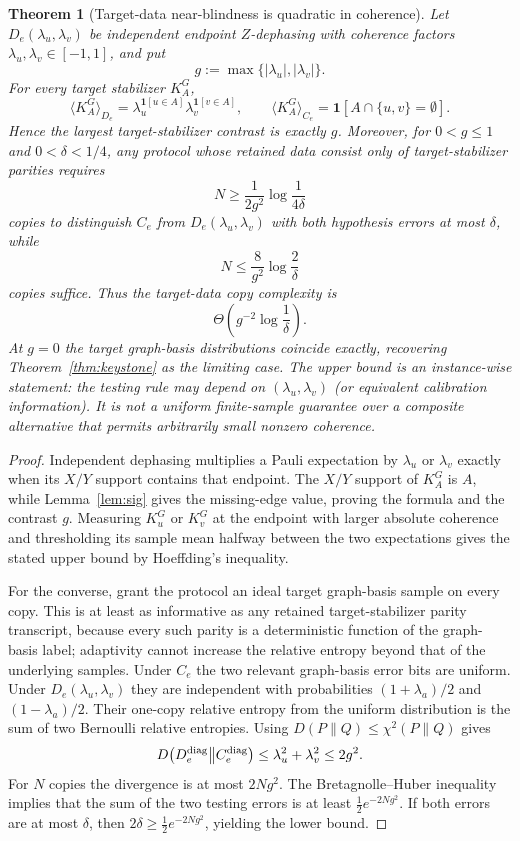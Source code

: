\documentclass[11pt]{article}
\newtheorem{theorem}{Theorem}[section]
\theoremstyle{remark}
\begin{document}
\begin{theorem}[Target-data near-blindness is quadratic in coherence]\label{prop:nearblind}
Let $D_e(\lambda_u,\lambda_v)$ be independent endpoint $Z$-dephasing with coherence factors $\lambda_u,\lambda_v\in[-1,1]$, and put
\[
 g:=\max\{|\lambda_u|,|\lambda_v|\}.
\]
For every target stabilizer $K_A^G$,
\[
\langle K_A^G\rangle_{D_e}
=\lambda_u^{\mathbf 1[u\in A]}\lambda_v^{\mathbf 1[v\in A]},
\qquad
\langle K_A^G\rangle_{C_e}=\mathbf 1[A\cap\{u,v\}=\emptyset].
\]
Hence the largest target-stabilizer contrast is exactly $g$. Moreover, for $0<g\le1$ and $0<\delta<1/4$, any protocol whose retained data consist only of target-stabilizer parities requires
\[
 N\ge \frac{1}{2g^2}\log\frac{1}{4\delta}
\]
copies to distinguish $C_e$ from $D_e(\lambda_u,\lambda_v)$ with both hypothesis errors at most $\delta$, while
\[
 N\le \frac{8}{g^2}\log\frac{2}{\delta}
\]
copies suffice. Thus the target-data copy complexity is
\[
\Theta\!\left(g^{-2}\log\frac1\delta\right).
\]
At $g=0$ the target graph-basis distributions coincide exactly, recovering Theorem~\ref{thm:keystone} as the limiting case. The upper bound is an instance-wise statement: the testing rule may depend on $(\lambda_u,\lambda_v)$ (or equivalent calibration information). It is not a uniform finite-sample guarantee over a composite alternative that permits arbitrarily small nonzero coherence.
\end{theorem}
\begin{proof}
Independent dephasing multiplies a Pauli expectation by $\lambda_u$ or $\lambda_v$ exactly when its $X/Y$ support contains that endpoint. The $X/Y$ support of $K_A^G$ is $A$, while Lemma~\ref{lem:sig} gives the missing-edge value, proving the formula and the contrast $g$. Measuring $K_u^G$ or $K_v^G$ at the endpoint with larger absolute coherence and thresholding its sample mean halfway between the two expectations gives the stated upper bound by Hoeffding's inequality.

For the converse, grant the protocol an ideal target graph-basis sample on every copy. This is at least as informative as any retained target-stabilizer parity transcript, because every such parity is a deterministic function of the graph-basis label; adaptivity cannot increase the relative entropy beyond that of the underlying samples. Under $C_e$ the two relevant graph-basis error bits are uniform. Under $D_e(\lambda_u,\lambda_v)$ they are independent with probabilities $(1+\lambda_a)/2$ and $(1-\lambda_a)/2$. Their one-copy relative entropy from the uniform distribution is the sum of two Bernoulli relative entropies. Using $D(P\|Q)\le\chi^2(P\|Q)$ gives
\[
 D\!\left(D_e^{\rm diag}\middle\|C_e^{\rm diag}\right)
 \le \lambda_u^2+\lambda_v^2\le2g^2.
\]
For $N$ copies the divergence is at most $2Ng^2$. The Bretagnolle--Huber inequality implies that the sum of the two testing errors is at least $\tfrac12 e^{-2Ng^2}$. If both errors are at most $\delta$, then $2\delta\ge\tfrac12e^{-2Ng^2}$, yielding the lower bound.
\end{proof}
\end{document}
